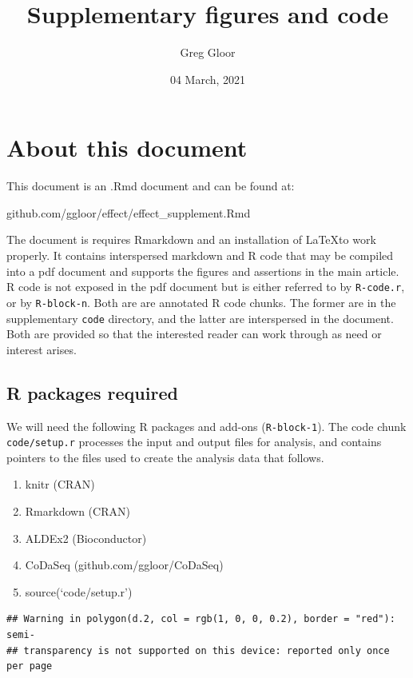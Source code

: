 \documentclass[onecolumn]{article}
\title{Supplementary figures and code}
\author{Greg Gloor}
\date{04 March, 2021}
\providecommand{\tightlist}{%
  \setlength{\itemsep}{0pt}\setlength{\parskip}{0pt}}
\begin{document}
\maketitle

{
\setcounter{tocdepth}{2}
\tableofcontents
}
\hypertarget{about-this-document}{%
\section{About this document}\label{about-this-document}}

This document is an .Rmd document and can be found at:

github.com/ggloor/effect/effect\_supplement.Rmd

The document is requires Rmarkdown and an installation of \LaTeX to work
properly. It contains interspersed markdown and R code that may be
compiled into a pdf document and supports the figures and assertions in
the main article. R code is not exposed in the pdf document but is
either referred to by \texttt{R-code.r}, or by \texttt{R-block-n}. Both
are are annotated R code chunks. The former are in the supplementary
\texttt{code} directory, and the latter are interspersed in the
document. Both are provided so that the interested reader can work
through as need or interest arises.

\hypertarget{r-packages-required}{%
\subsection{R packages required}\label{r-packages-required}}

We will need the following R packages and add-ons (\texttt{R-block-1}).
The code chunk \texttt{code/setup.r} processes the input and output
files for analysis, and contains pointers to the files used to create
the analysis data that follows.

\begin{enumerate}
\def\labelenumi{\arabic{enumi}.}
\tightlist
\item
  knitr (CRAN)
\item
  Rmarkdown (CRAN)
\item
  ALDEx2 (Bioconductor)
\item
  CoDaSeq (github.com/ggloor/CoDaSeq)
\item
  source(`code/setup.r')
\end{enumerate}

\begin{verbatim}
## Warning in polygon(d.2, col = rgb(1, 0, 0, 0.2), border = "red"): semi-
## transparency is not supported on this device: reported only once per page
\end{verbatim}
\end{document}
